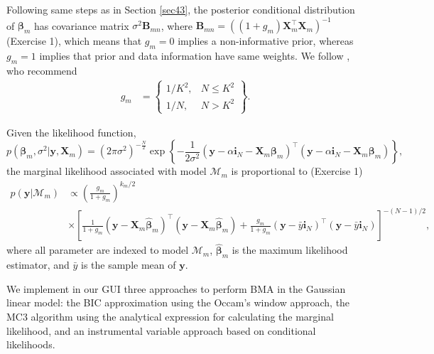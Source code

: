 Following same steps as in Section \ref{sec43}, the posterior conditional distribution of $\bm{\beta}_m$ has covariance matrix $\sigma^2\bm{B}_{mn}$, where $\bm{B}_{mn}=((1+g_m)\bm{X}_m^{\top}\bm{X}_m)^{-1}$ (Exercise 1), which means that $g_m=0$ implies a non-informative prior, whereas $g_m=1$ implies that prior and data information have same weights. We follow \cite{fernandez2001benchmark}, who recommend
\begin{align*}
	g_m & =
	\begin{Bmatrix}
		1/K^2, & N \leq K^2\\
		1/N, & N>K^2 
	\end{Bmatrix}.
\end{align*}  
 
Given the likelihood function, 
\begin{equation*}
	p(\bm{\beta}_m, \sigma^2|\bm{y}, \bm{X}_m) = (2\pi\sigma^2)^{-\frac{N}{2}} \exp \left\{-\frac{1}{2\sigma^2} (\bm{y} - \alpha\bm{i}_N - \bm{X}_m\bm{\beta}_m)^{\top}(\bm{y} - \alpha\bm{i}_N - \bm{X}_m\bm{\beta}_m) \right\},
\end{equation*}
the marginal likelihood associated with model $\mathcal{M}_m$ is proportional to (Exercise 1) 
\begin{align*}
	p(\bm{y}|\mathcal{M}_m)&\propto \left(\frac{g_m}{1+g_m}\right)^{k_m/2}\\
	&\times \left[\frac{1}{1+g_m}(\bm{y}-\bm{X}_m\hat{\bm{\beta}}_m)^{\top}(\bm{y}-\bm{X}_m\hat{\bm{\beta}}_m)+\frac{g_m}{1+g_m}(\bm{y}-\bar{y}\bm{i}_N)^{\top}(\bm{y}-\bar{y}\bm{i}_N)\right]^{-(N-1)/2},
\end{align*}
where all parameter are indexed to model $\mathcal{M}_m$, $\hat{\bm{\beta}}_m$ is the maximum likelihood estimator, and $\bar{y}$ is the sample mean of $\bm{y}$.

We implement in our GUI three approaches to perform BMA in the Gaussian linear model: the BIC approximation using the Occam's window approach, the MC3 algorithm using the analytical expression for calculating the marginal likelihood, and an instrumental variable approach based on conditional likelihoods.\\



